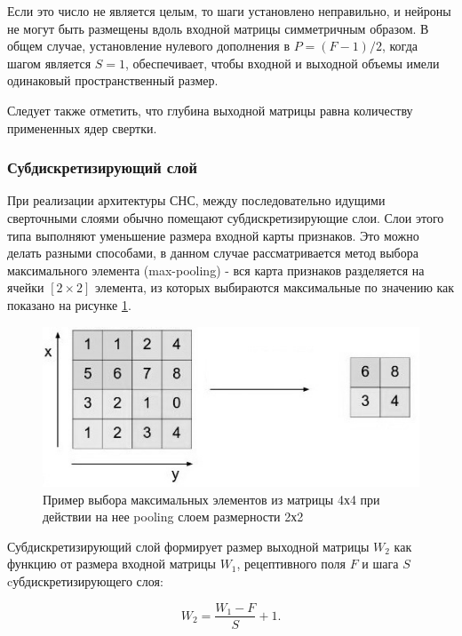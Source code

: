 \documentclass[14pt]{article}
\numberwithin{figure}{section}
\numberwithin{equation}{section}
\begin{document}
Если это число не является целым, то шаги установлено неправильно, и нейроны не могут быть размещены вдоль входной матрицы симметричным образом. В общем случае, установление нулевого дополнения в $P = (F - 1) / 2$, когда шагом является $S = 1$, обеспечивает, чтобы входной и выходной объемы имели одинаковый пространственный размер.

Следует также отметить, что глубина выходной матрицы равна количеству примененных ядер свертки.

\subsubsection{Субдискретизирующий слой}

При реализации архитектуры СНС, между последовательно идущими сверточными слоями обычно помещают субдискретизирующие слои. Слои этого типа выполняют уменьшение размера входной карты признаков. Это можно делать разными способами, в данном случае рассматривается метод выбора максимального элемента (max-pooling) - вся карта признаков разделяется на ячейки $[2 \times 2]$ элемента, из которых выбираются максимальные по значению как показано на рисунке \ref{ris:7}.

\begin{figure}[h]
	\begin{center}
		\includegraphics[scale=0.7] {7.JPG}
		\caption{Пример выбора максимальных элементов из матрицы 4х4 при действии на нее pooling слоем размерности 2х2}
		\label{ris:7}
	\end{center}
\end{figure}

Субдискретизирующий слой формирует размер выходной матрицы $W_2$ как функцию от размера входной матрицы $W_1$, рецептивного поля $F$ и шага $S$ cубдискретизирующего слоя\cite{Stanford}:

\begin{equation}
	W_2 = \frac{W_1 - F}{S} + 1.
\end{equation}
\end{document}
